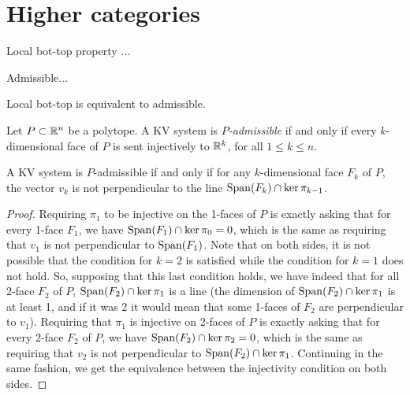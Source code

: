 
\section{Higher categories}

\begin{definition}
	Local bot-top property ...
\end{definition}

\begin{definition}
	Admissible...
\end{definition}

\begin{lemma}
	Local bot-top is equivalent to admissible.
\end{lemma}

\begin{definition}
	Let $P \subset \mathbb{R}^n$ be a polytope.
	A KV system is \emph{$P$-admissible} if and only if every $k$-dimensional face of $P$ is sent injectively to $\mathbb{R}^k$, for all $1\leq k \leq n$.
\end{definition}

\begin{proposition}
	\label{prop:P-admissible}
	A KV system is $P$-admissible if and only if for any $k$-dimensional face $F_k$ of $P$, the vector $v_k$ is not perpendicular to the line $\operatorname{\mathrm{Span}}(F_k) \cap \ker \pi_{k-1}$.
\end{proposition}

\begin{proof}
	Requiring $\pi_1$ to be injective on the 1-faces of $P$ is exactly asking that for every 1-face $F_1$, we have $\operatorname{\mathrm{Span}}(F_1)\cap \ker \pi_0=0$, which is the same as requiring that $v_1$ is not perpendicular to $\operatorname{\mathrm{Span}}(F_1)$.
	Note that on both sides, it is not possible that the condition for $k=2$ is satisfied while the condition for $k=1$ does not hold.
	So, supposing that this last condition holds, we have indeed that for all 2-face $F_2$ of $P$, $\operatorname{\mathrm{Span}}(F_2)\cap \ker \pi_1$ is a line (the dimension of $\operatorname{\mathrm{Span}}(F_2)\cap \ker \pi_1$ is at least 1, and if it was 2 it would mean that some 1-faces of $F_2$ are perpendicular to $v_1$).
	Requiring that $\pi_1$ is injective on 2-faces of $P$ is exactly asking that for every 2-face $F_2$ of $P$, we have $\operatorname{\mathrm{Span}}(F_2)\cap \ker \pi_2=0$, which is the same as requiring that $v_2$ is not perpendicular to $\operatorname{\mathrm{Span}}(F_2)\cap \ker \pi_1$.
	Continuing in the same fashion, we get the equivalence between the injectivity condition on both sides.
\end{proof}


